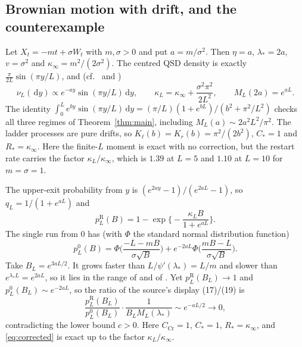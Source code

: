 \documentclass[11pt,a4paper]{article}
\theoremstyle{definition}
\theoremstyle{remark}
\newcommand{\1}{\mathbf 1}
\newcommand{\dd}{\,\mathrm d}
\newcommand{\Kl}{K_{\ell}}
\newcommand{\Kr}{K_{r}}
\newcommand{\kinf}{\kappa_\infty}
\begin{document}
\subsection{Brownian motion with drift, and the counterexample}\label{sec:brownian}
Let $X_t=-mt+\sigma W_t$ with $m,\sigma>0$ and put $a=m/\sigma^2$. Then $\eta=a$, $\lambda_*=2a$, $v=\sigma^2$ and $\kinf=m^2/(2\sigma^2)$. The centred QSD density is exactly $\frac{\pi}{2L}\sin(\pi y/L)$, and (cf.\ \cite{martinezsm} and \cite[Proof 6.5]{garcia})
\begin{equation}\label{eq:brownian-exact}
 \nu_L(\dd y)\propto e^{-ay}\sin(\pi y/L)\dd y,\qquad \kappa_L=\kinf+\frac{\sigma^2\pi^2}{2L^2},\qquad M_L(2a)=e^{aL}.
\end{equation}
The identity $\int_0^Le^{by}\sin(\pi y/L)\dd y=(\pi/L)(1+e^{bL})/(b^2+\pi^2/L^2)$ checks all three regimes of Theorem~\ref{thm:main}, including $M_L(a)\sim2a^2L^2/\pi^2$. The ladder processes are pure drifts, so $\Kl(b)=\Kr(b)=\pi^2/(2b^2)$, $C_*=1$ and $R_*=\kinf$. Here the finite-$L$ moment is exact with no correction, but the restart rate carries the factor $\kappa_L/\kinf$, which is $1.39$ at $L=5$ and $1.10$ at $L=10$ for $m=\sigma=1$.

The upper-exit probability from $y$ is $(e^{2ay}-1)/(e^{2aL}-1)$, so $q_L=1/(1+e^{aL})$ and
\begin{equation}\label{eq:brownian-restart}
 p^{\mathrm R}_L(B)=1-\exp\Big\{-\frac{\kappa_LB}{1+e^{aL}}\Big\}.
\end{equation}
The single run from $0$ has (with $\Phi$ the standard normal distribution function)
\begin{equation}\label{eq:ordinary-brownian}
 p^0_L(B)=\Phi\Big(\frac{-L-mB}{\sigma\sqrt B}\Big)+e^{-2aL}\Phi\Big(\frac{mB-L}{\sigma\sqrt B}\Big).
\end{equation}
Take $B_L=e^{3aL/2}$. It grows faster than $L/\psi'(\lambda_*)=L/m$ and slower than $e^{\lambda_*L}=e^{2aL}$, so it lies in the range of \cite[Theorem 3.14]{garcia} and of \cite[Corollary 3.15]{garcia}. Yet $p^{\mathrm R}_L(B_L)\to1$ and $p^0_L(B_L)\sim e^{-2aL}$, so the ratio of the source's display (17)/(19) is
\begin{equation}\label{eq:counterexample}
 \frac{p^{\mathrm R}_L(B_L)}{p^0_L(B_L)}\cdot\frac{1}{B_LM_L(\lambda_*)}\sim e^{-aL/2}\longrightarrow0,
\end{equation}
contradicting the lower bound $c>0$. Here $C_{\mathrm{Cr}}=1$, $C_*=1$, $R_*=\kinf$, and \eqref{eq:corrected} is exact up to the factor $\kappa_L/\kinf$.
\end{document}
